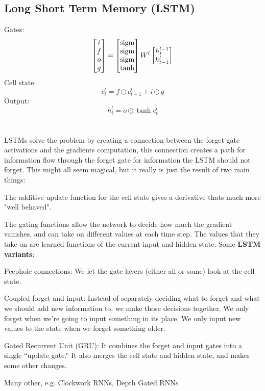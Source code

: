 \documentclass[12pt]{article}
\begin{document}
\subsection{Long Short Term Memory (LSTM)}
Gates:
\[
\begin{bmatrix}
i \\ f \\ o \\ g
\end{bmatrix} = 
\begin{bmatrix}
\mathop{\text{sigm}} \\ \mathop{\text{sigm}} \\ \mathop{\text{sigm}} \\ \tanh
\end{bmatrix}
W^l
\begin{bmatrix}
h_t^{l-1} \\ h_{t-1}^l
\end{bmatrix}
\]
\mpe%
Cell state:
\[ c_t^l = f \odot c_{t-1}^l + i \odot g \]
\mpe%
Output: \\
\[ h_t^l = o \odot \tanh{c_t^l} \]
\mpe
\\\\
LSTMs solve the problem by creating a connection between the forget gate activations and the gradients computation, this connection creates a path for information flow through the forget gate for information the LSTM should not forget.
This might all seem magical, but it really is just the result of two main things:
\ulb
\item The additive update function for the cell state gives a derivative thats much more "well behaved".
\item The gating functions allow the network to decide how much the gradient vanishes, and can take on different values at each time step. The values that they take on are learned functions of the current input and hidden state.
\ule
Some \textbf{LSTM variants}:
\ulb
\item Peephole connections: We let the gate layers (either all or some) look at the cell state.
\item Coupled forget and input: Instead of separately deciding what to forget and what we should add new information to, we make those decisions together. We only forget when we’re going to input something in its place. We only input new values to the state when we forget something older.
\item Gated Recurrent Unit (GRU): It combines the forget and input gates into a single “update gate.” It also merges the cell state and hidden state, and makes some other changes.
\item Many other, e.g. Clockwork RNNs, Depth Gated RNNs
\ule
\end{document}
